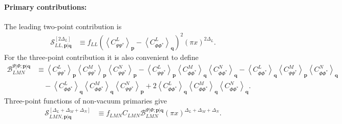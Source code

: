 \documentclass[11pt]{article}
\newcommand{\nn}{\nonumber}
\begin{document}
\paragraph{Primary contributions:}
The leading two-point contribution is
\begin{align}
    \mathcal S_{LL,\mathbf p|\mathbf q}^{[2\Delta_L]}
    &\equiv
    f_{LL}
    \left(
    \left\langle C_{\Psi\Psi^*}^{L}\right\rangle_{\mathbf p}
    -
    \left\langle C_{\Phi\Phi^*}^{L}\right\rangle_{\mathbf q}
    \right)^2
    (\pi x)^{2\Delta_L}.
\end{align}
For the three-point contribution it is also convenient to define
\begin{align}
\mathcal B_{LMN}^{\Psi|\Phi;\mathbf p|\mathbf q}
&\equiv{}
\left\langle C_{\Psi\Psi^*}^{L}\right\rangle_{\mathbf p}
\left\langle C_{\Psi\Psi^*}^{M}\right\rangle_{\mathbf p}
\left\langle C_{\Psi\Psi^*}^{N}\right\rangle_{\mathbf p}
-
\left\langle C_{\Psi\Psi^*}^{L}\right\rangle_{\mathbf p}
\left\langle C_{\Phi\Phi^*}^{M}\right\rangle_{\mathbf q}
\left\langle C_{\Phi\Phi^*}^{N}\right\rangle_{\mathbf q}
-
\left\langle C_{\Phi\Phi^*}^{L}\right\rangle_{\mathbf q}
\left\langle C_{\Psi\Psi^*}^{M}\right\rangle_{\mathbf p}
\left\langle C_{\Phi\Phi^*}^{N}\right\rangle_{\mathbf q}
\nn\\
&\quad
-
\left\langle C_{\Phi\Phi^*}^{L}\right\rangle_{\mathbf q}
\left\langle C_{\Phi\Phi^*}^{M}\right\rangle_{\mathbf q}
\left\langle C_{\Psi\Psi^*}^{N}\right\rangle_{\mathbf p}
+
2
\left\langle C_{\Phi\Phi^*}^{L}\right\rangle_{\mathbf q}
\left\langle C_{\Phi\Phi^*}^{M}\right\rangle_{\mathbf q}
\left\langle C_{\Phi\Phi^*}^{N}\right\rangle_{\mathbf q}.
\end{align}
Three-point functions of non-vacuum primaries give
\begin{align}
    \mathcal S_{LMN,\mathbf p|\mathbf q}^{[\Delta_L+\Delta_M+\Delta_N]}
    &\equiv
    f_{LMN}C_{LMN}
    \mathcal B_{LMN}^{\Psi|\Phi;\mathbf p|\mathbf q}
    (\pi x)^{\Delta_L+\Delta_M+\Delta_N}.
\end{align}
\end{document}
